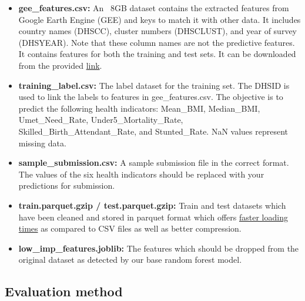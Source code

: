 \documentclass{article}
\begin{document}
\begin{itemize}

\item \textbf{gee\_features.csv:} An ~8GB dataset contains the extracted features from Google Earth Engine (GEE) and keys to match it with other data. It includes country names (DHSCC), cluster numbers (DHSCLUST), and year of survey (DHSYEAR). Note that these column names are not the predictive features. It contains features for both the training and test sets. It can be downloaded from the provided \href{https://www.kaggle.com/competitions/maternal-and-child-health-monitoring-in-lmics/data}{link}.

\item \textbf{training\_label.csv:} The label dataset for the training set. The DHSID is used to link the labels to features in gee\_features.csv. The objective is to predict the following health indicators: Mean\_BMI, Median\_BMI, Umet\_Need\_Rate, Under5\_Mortality\_Rate, Skilled\_Birth\_Attendant\_Rate, and Stunted\_Rate. NaN values represent missing data.

\item \textbf{sample\_submission.csv:} A sample submission file in the correct format. The values of the six health indicators should be replaced with your predictions for submission.

\item \textbf{train.parquet.gzip / test.parquet.gzip:} Train and test datasets which have been cleaned and stored in parquet format which offers \href{https://datos.gob.es/en/blog/why-should-you-use-parquet-files-if-you-process-lot-data}{faster loading times} as compared to CSV files as well as better compression.

\item \textbf{low\_imp\_features.joblib:} The features which should be dropped from the original dataset as detected by our base random forest model.

\end{itemize}


\subsection{Evaluation method}
\end{document}
